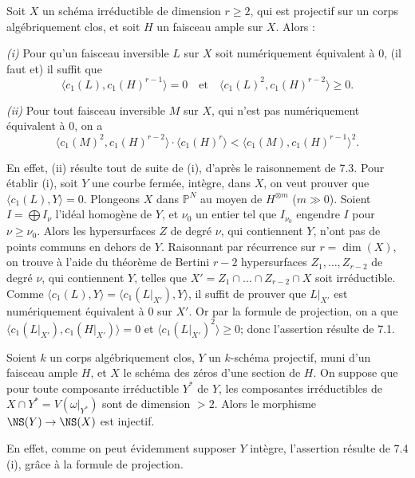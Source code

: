 \begin{corollaire}[7.4]
Soit $X$ un sch\'ema irr\'eductible de dimension $r \geq 2$, qui est projectif sur un corps alg\'ebriquement clos, et soit $H$ un faisceau ample sur $X$. Alors :

\emph{(i)} Pour qu'un faisceau inversible $L$ sur $X$ soit num\'eriquement \'equivalent \`a $0$, (il faut et) il suffit que
\[
\langle c_1(L), c_1(H)^{r-1} \rangle = 0 \quad \text{et} \quad \langle c_1(L)^2, c_1(H)^{r-2} \rangle \geq 0.
\]

\emph{(ii)} Pour tout faisceau inversible $M$ sur $X$, qui n'est pas num\'eriquement \'equivalent \`a $0$, on a
\[
\langle c_1(M)^2, c_1(H)^{r-2} \rangle \cdot \langle c_1(H)^r \rangle < \langle c_1(M), c_1(H)^{r-1} \rangle^2.
\]
\end{corollaire}

En effet, (ii) r\'esulte tout de suite de (i), d'apr\`es le raisonnement de 7.3. Pour \'etablir (i), soit $Y$ une courbe ferm\'ee, int\`egre, dans $X$, on veut prouver que $\langle c_1(L), Y \rangle = 0$. Plongeons $X$ dans $\mathbb{P}^N$ au moyen de $H^{\otimes m}$ ($m \gg 0$). Soient $I = \bigoplus I_\nu$ l'id\'eal homog\`ene de $Y$, et $\nu_0$ un entier tel que $I_{\nu_0}$ engendre $I$ pour $\nu \geq \nu_0$. Alors les hypersurfaces $Z$ de degr\'e $\nu$, qui contiennent $Y$, n'ont pas de points communs en dehors de $Y$. Raisonnant par r\'ecurrence sur $r = \dim(X)$, on trouve \`a l'aide du th\'eor\`eme de Bertini $r-2$ hypersurfaces $Z_1, \dots, Z_{r-2}$ de degr\'e $\nu$, qui contiennent $Y$, telles que $X' = Z_1 \cap \dots \cap Z_{r-2} \cap X$ soit irr\'eductible. Comme $\langle c_1(L), Y \rangle = \langle c_1(L|_{X'}), Y \rangle$, il suffit de prouver que $L|_{X'}$ est num\'eriquement \'equivalent \`a $0$ sur $X'$. Or par la formule de projection, on a que $\langle c_1(L|_{X'}), c_1(H|_{X'}) \rangle = 0$ et $\langle c_1(L|_{X'})^2 \rangle \geq 0$; donc l'assertion r\'esulte de 7.1.

\begin{corollaire}[7.5]
Soient $k$ un corps alg\'ebriquement clos, $Y$ un $k$-sch\'ema projectif, muni d'un faisceau ample $H$, et $X$ le sch\'ema des z\'eros d'une section de $H$. On suppose que pour toute composante irr\'eductible $Y^*$ de $Y$, les composantes irr\'eductibles de $X \cap Y^* = V(\omega|_{Y^*})$ sont de dimension $> 2$. Alors le morphisme $\NS(Y) \to \NS(X)$ est injectif.
\end{corollaire}

En effet, comme on peut \'evidemment supposer $Y$ int\`egre, l'assertion r\'esulte de 7.4 (i), gr\^ace \`a la formule de projection.

